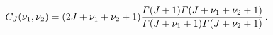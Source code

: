 \begin{equation}
C_J (\nu_1, \nu_2)
=
(2 J  + \nu_1 + \nu_2 + 1)
\frac{
{\mit\Gamma} (J + 1) {\mit\Gamma} (J + \nu_1 + \nu_2 + 1)
}{
{\mit\Gamma} (J + \nu_1 + 1) {\mit\Gamma} (J + \nu_2 + 1)
}
\, .
\end{equation}

